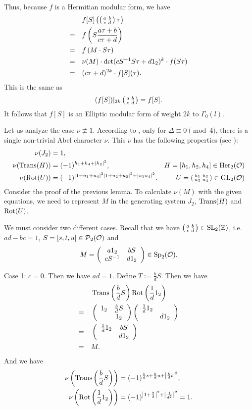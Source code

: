 \begin{lemma}[Restriction]
Thus, because $f$ is a Hermitian modular form, we have
\begin{align*}
& f[S] \left(\left( \begin{smallmatrix} a & b \\ c & d \end{smallmatrix} \right) \tau\right) \\
=\quad & f\left(S \frac{a \tau + b}{c \tau + d} \right) \\
=\quad & f\left( M \cdot S \tau \right) \\
=\quad & \nu(M) \cdot \det(c S^{-1} S \tau + d 1_2)^k \cdot f(S \tau) \\
=\quad & (c \tau + d)^{2k} \cdot f[S](\tau) .
\end{align*}
This is the same as
\[ (f[S]) |_{2k} \left( \begin{smallmatrix} a & b \\ c & d \end{smallmatrix} \right) = f[S] . \]
It follows that $f[S]$ is an Elliptic modular form of weight $2k$ to $\Gamma_0(l)$.
\endproof
\end{lemma}


\begin{remark}\label{remark-nu}
Let us analyze the case $\nu \not\equiv 1$. According to \cite{Dern01Herm}, only for $\Delta \equiv 0 \pmod{4}$, there is a single non-trivial Abel character $\nu$. This $\nu$ has the following properties (see \cite{Dern01Herm}):
\begin{align*}
\nu(J_2) & = 1 , \\
\nu(\operatorname{Trans}(H)) & = (-1)^{h_1 + h_4 + |h_2|^2}, & H = [h_1, h_2, h_4] \in \operatorname{Her}_2(\mathcal{O}) \\
\nu(\operatorname{Rot}(U)) & = (-1)^{|1+u_1+u_4|^2 |1+u_2+u_3|^2 + |u_1 u_4|^2} . & U = \left( \begin{smallmatrix} u_1 & u_2 \\ u_3 & u_4 \end{smallmatrix} \right) \in \operatorname{GL}_2(\mathcal{O})
\end{align*}
Consider the proof of the previous lemma. To calculate $\nu(M)$ with the given equations, we need to represent $M$ in the generating system $J_2$, $\operatorname{Trans}(H)$ and $\operatorname{Rot}(U)$.

We must consider two different cases. Recall that we have $\left( \begin{smallmatrix} a & b \\ c & d \end{smallmatrix} \right) \in \operatorname{SL}_2(\mathbb{Z})$, i.e. $ad - bc = 1$, $S = [s,t,u] \in \operatorname{\mathcal{P}}_2(\mathcal{O})$ and
\[ M = \left( \begin{array}{cc} a 1_2 & b S \\ c S^{-1} & d 1_2 \end{array} \right) \in \operatorname{Sp}_2(\mathcal{O}) . \]

Case 1: $c=0$. Then we have $ad=1$. Define $T := \frac{b}{d} S$. Then we have
\begin{align*}
& \operatorname{Trans}\left(\frac{b}{d} S\right) \operatorname{Rot}\left(\frac{1}{d} 1_2\right) \\
=\quad &
\left( \begin{array}{cc} 1_2 & \frac{b}{d} S \\  & 1_2 \end{array} \right)
\left( \begin{array}{cc} \frac{1}{d} 1_2 &  \\  & d 1_2 \end{array} \right) \\
=\quad &
\left( \begin{array}{cc} \frac{1}{d}1_2 & b S \\  & d 1_2 \end{array} \right) \\
=\quad& M .
\end{align*}
And we have
\begin{align*}
\nu\left(\operatorname{Trans}\left(\frac{b}{d} S\right)\right) & = (-1)^{\frac{b}{d}s + \frac{b}{d}u + \left|\frac{b}{d} t \right|^2}, \\
\nu\left(\operatorname{Rot}\left(\frac{1}{d} 1_2\right)\right) & = (-1)^{\left|1 + \frac{2}{d}\right|^2 + \left|\frac{1}{d^2}\right|^2} = 1 .
\end{align*}


\end{remark}
